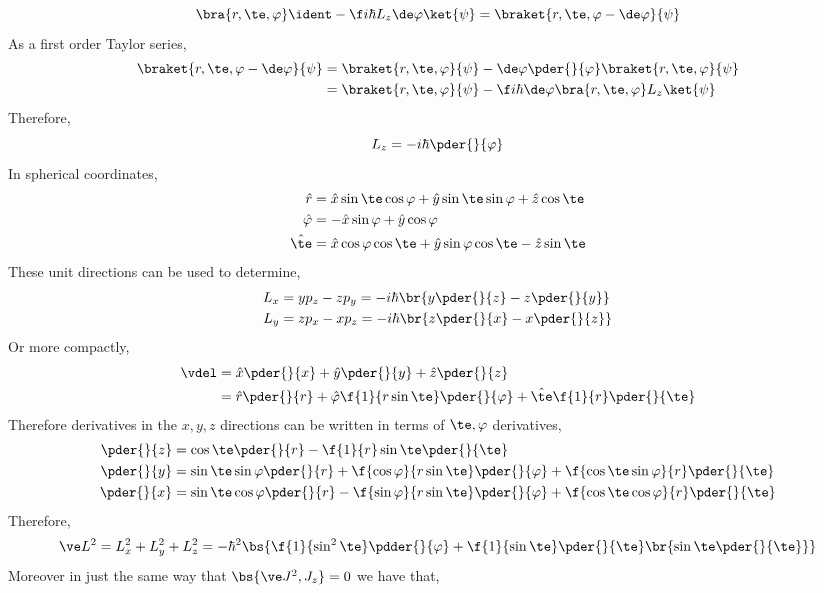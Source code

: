 \documentclass{article}
\begin{document}
\[ \bra{r, \te, \varphi} \ident - \f i \hbar L_z \de \varphi \ket{\psi} = \braket{r, \te, \varphi - \de \varphi}{\psi} \]
As a first order Taylor series,
\begin{align*}
    \braket{r, \te, \varphi - \de \varphi}{\psi}
    &= \braket{r, \te, \varphi}{\psi} - \de \varphi \pder{}{\varphi} \braket{r, \te, \varphi}{\psi} \\
    &= \braket{r, \te, \varphi}{\psi} - \f i \hbar \de \varphi \bra{r, \te, \varphi}L_z\ket{\psi}
\end{align*}
Therefore,
\[ L_z = - i \hbar \pder{}{\varphi} \]
In spherical coordinates,
\begin{align*}
    \hat r &= \hat x \sin \te \cos \varphi + \hat y \sin \te \sin \varphi + \hat z \cos \te \\
    \hat \varphi &= - \hat x \sin \varphi + \hat y \cos \varphi \\
    \hat \te &= \hat x \cos \varphi \cos \te + \hat y \sin \varphi \cos \te - \hat z \sin \te
\end{align*}
These unit directions can be used to determine,
\begin{align*}
L_x &= y p_z - z p_y = - i \hbar \br{y \pder{}{z} - z \pder{}{y}} \\
L_y &= z p_x - x p_z = - i \hbar \br{z \pder{}{x} - x \pder{}{z}}
\end{align*}
Or more compactly,
\begin{align*}
\vdel
&= \hat x \pder{}{x} + \hat y \pder{}{y} + \hat z \pder{}{z} \\
&= \hat r \pder{}{r} + \hat \varphi \f{1}{r \sin \te} \pder{}{\varphi} + \hat \te \f{1}{r}\pder{}{\te}
\end{align*}
Therefore derivatives in the $x,y,z$ directions can be written in terms of $\te, \varphi$ derivatives,
\begin{align*}
    \pder{}{z} &= \cos \te \pder{}{r} - \f{1}{r} \sin \te \pder{}{\te}\\
    \pder{}{y} &=  \sin \te \sin \varphi \pder{}{r} + \f{\cos \varphi}{r \sin \te} \pder{}{\varphi} + \f{\cos \te \sin \varphi}{r} \pder{}{\te}\\
    \pder{}{x} &=  \sin \te \cos \varphi \pder{}{r} - \f{\sin \varphi}{r \sin \te} \pder{}{\varphi} + \f{\cos \te \cos \varphi}{r} \pder{}{\te}
\end{align*}
Therefore,
\[ \ve L^2 = L_x^2 + L_y^2 + L_z^2 = - \hbar^2 \bs{\f{1}{\sin^2 \te} \pdder{}{\varphi} + \f{1}{\sin \te} \pder{}{\te} \br{\sin \te \pder{}{\te}}} \]
Moreover in just the same way that $\bs{\ve J^2, J_z} = 0$ we have that,
\end{document}
